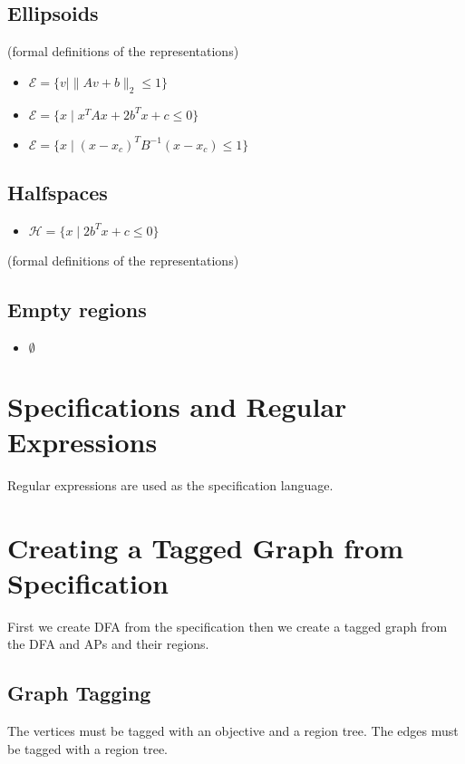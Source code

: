 \documentclass[letterpaper, 10 pt, conference]{ieeeconf}  %
\begin{document}
\subsection{Ellipsoids}
(formal definitions of the representations)
\begin{itemize}
	\item $\mathcal{E} = \{ v \mid \|A v + b\|_2 \leq 1  \}$
	\item $\mathcal{E} = \{ x \mid x^T A x + 2 b^Tx + c \leq 0 \}$
	\item $\mathcal{E} = \{ x \mid (x - x_c)^T B^{-1} (x - x_c) \leq 1 \}$
\end{itemize}

\subsection{Halfspaces}
\begin{itemize}
	\item $\mathcal{H} = \{ x \mid 2b^Tx + c \leq 0 \}$
\end{itemize}
(formal definitions of the representations)

\subsection{Empty regions}
\begin{itemize}
	\item $\emptyset$
\end{itemize}

\section{Specifications and Regular Expressions}

Regular expressions are used as the specification language.

\section{Creating a Tagged Graph from Specification}

First we create DFA from the specification then we create a tagged graph from the DFA and APs and their regions.

\subsection{Graph Tagging}
The vertices must be tagged with an objective and a region tree. The edges must be tagged with a region tree.
 
\end{document}
